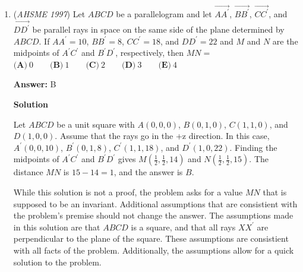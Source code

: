 \begin{enumerate}
The list starts with $12345$.  There are $\binom{8}{4} = 70$ four-digit rising numbers that do not begin with $1$, and thus also $70$ five digit rising numbers that do begin with $1$ that are formed by simply putting a $1$ before the four digit number.

 Thus, the $71^{\text{st}}$ number is $23456$.  There are $\binom{6}{3} = 20$ three-digit rising numbers that do not begin with a $1,2$ or $3$, and thus $20$ five digit rising numbers that begin with a $23$.

 Thus, the $91^{\text{st}}$ number is $24567$.  Counting up, $24568, 24569, 24578, 24579, 24589, 24678$ is the $97^{\text{th}}$ number, which does not contain the digit $\boxed{\textbf{(B)} \ 5}$.

 


	\item (\textit{AHSME 1997}) Let $ABCD$ be a parallelogram and let $\overrightarrow{AA^\prime}$, $\overrightarrow{BB^\prime}$, $\overrightarrow{CC^\prime}$, and $\overrightarrow{DD^\prime}$ be parallel rays in space on the same side of the plane determined by $ABCD$. If $AA^\prime = 10$, $BB^\prime = 8$, $CC^\prime = 18$, and $DD^\prime = 22$ and $M$ and $N$ are the midpoints of $A^\prime C^\prime$ and $B^\prime D^\prime$, respectively, then $MN =$
$\textbf{(A)}\ 0\qquad\textbf{(B)}\ 1\qquad\textbf{(C)}\ 2\qquad\textbf{(D)}\ 3\qquad\textbf{(E)}\ 4$

 \textbf{Answer: }B



\textbf{Solution}

Let $ABCD$ be a unit square with $A(0,0,0)$, $B(0,1,0)$, $C(1,1,0)$, and $D(1,0,0)$.  Assume that the rays go in the +z direction.  In this case, $A^\prime(0,0,10)$, $B^\prime(0,1,8)$,  $C^\prime(1,1,18)$, and $D^\prime(1,0,22)$.  Finding the midpoints of $A^\prime C^\prime$ and $B^\prime D^\prime$ gives $M(\frac{1}{2}, \frac{1}{2}, 14)$ and $N(\frac{1}{2}, \frac{1}{2}, 15)$.  The distance $MN$ is $15 - 14 = 1$, and the answer is $\boxed{B}$.    

 
While this solution is not a proof, the problem asks for a value $MN$ that is supposed to be an invariant.  Additional assumptions that are consistient with the problem's premise should not change the answer.  The assumptions made in this solution are that $ABCD$ is a square, and that all rays $XX^\prime$ are perpendicular to the plane of the square.  These assumptions are consistient with all facts of the problem.  Additionally, the assumptions allow for a quick solution to the problem.


\end{enumerate}
